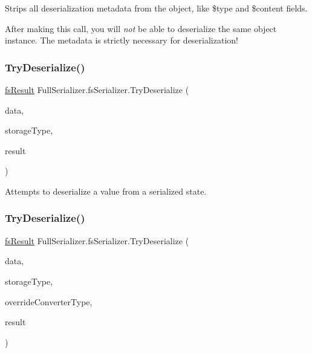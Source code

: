 Strips all deserialization metadata from the object, like \$type and \$content fields. 

After making this call, you will {\itshape not} be able to deserialize the same object instance. The metadata is strictly necessary for deserialization!\mbox{\label{class_full_serializer_1_1fs_serializer_a9ada1781fcc582b65d809815fe2c24e9}} 
\subsubsection{\texorpdfstring{Try\+Deserialize()}{TryDeserialize()}\hspace{0.1cm}{\footnotesize\ttfamily [1/2]}}
{\footnotesize\ttfamily \hyperlink{struct_full_serializer_1_1fs_result}{fs\+Result} Full\+Serializer.\+fs\+Serializer.\+Try\+Deserialize (\begin{DoxyParamCaption}\item[{\hyperlink{class_full_serializer_1_1fs_data}{fs\+Data}}]{data,  }\item[{Type}]{storage\+Type,  }\item[{ref object}]{result }\end{DoxyParamCaption})\hspace{0.3cm}{\ttfamily [inline]}}



Attempts to deserialize a value from a serialized state. 

\mbox{\label{class_full_serializer_1_1fs_serializer_a16a24f10dfdc70f69e2ace4f2e4d891e}} 
\subsubsection{\texorpdfstring{Try\+Deserialize()}{TryDeserialize()}\hspace{0.1cm}{\footnotesize\ttfamily [2/2]}}
{\footnotesize\ttfamily \hyperlink{struct_full_serializer_1_1fs_result}{fs\+Result} Full\+Serializer.\+fs\+Serializer.\+Try\+Deserialize (\begin{DoxyParamCaption}\item[{\hyperlink{class_full_serializer_1_1fs_data}{fs\+Data}}]{data,  }\item[{Type}]{storage\+Type,  }\item[{Type}]{override\+Converter\+Type,  }\item[{ref object}]{result }\end{DoxyParamCaption})\hspace{0.3cm}{\ttfamily [inline]}}



